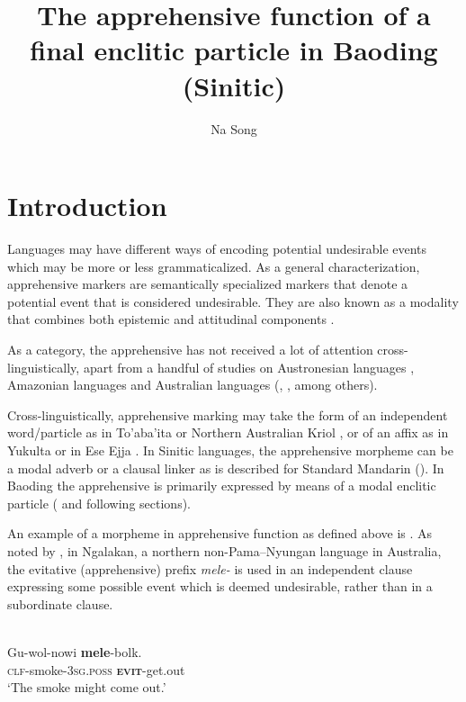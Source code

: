 \documentclass[output=paper,colorlinks,citecolor=brown, language=chinese]{langscibook}
\author{Na Song\orcid{}\affiliation{INALCO-CRLAO}}
\title{The apprehensive function of a final enclitic particle in Baoding (Sinitic)}
\begin{document}
\maketitle

\section{Introduction}

Languages may have different ways of encoding potential undesirable events which may be more or less grammaticalized. As a general characterization, apprehensive markers are semantically specialized markers that denote a potential event that is considered undesirable. They are also known as a modality that combines both epistemic and attitudinal components \citep[293]{lichtenberk1995}.

As a category, the apprehensive has not received a lot of attention cross-linguistically, apart from a handful of studies on Austronesian languages \citep{lichtenberk1995}, Amazonian languages \citep{vuillermet2018a} and Australian languages (\cite{Dixon2002}, \cite[255--296]{AngeloSchultze-Berndt2016}, \cite{Verstraete2005} among others).

Cross-linguistically, apprehensive marking may take the form of an independent word/particle as in To'aba'ita \citep{lichtenberk1995} or Northern Australian Kriol \citep{AngeloSchultze-Berndt2016}, or of an affix as in Yukulta \citep[247]{Keen1983} or in Ese Ejja \citep{vuillermet2018a}. In Sinitic languages, the apprehensive morpheme can be a modal adverb or a clausal linker as is described for Standard Mandarin (). In Baoding the apprehensive is primarily expressed by means of  a modal enclitic particle ( and following sections).

An example of a morpheme in apprehensive function as defined above is . As noted by \citet[102]{Merlan1983}, in Ngalakan, a northern non-Pama–Nyungan language in Australia, the evitative (apprehensive) prefix \textit{mele-} is used in an independent clause expressing some possible event which is deemed undesirable, rather than in a subordinate clause. 

\ea
\label{ex:Song1} 
 \\
\gll Gu-wol-nowi \textbf{mele}-bolk. \\
\textsc{clf}-smoke-\textsc{3sg.poss} \textbf{\textsc{evit}}-get.out \\
\glt `The smoke might come out.'
\z
\end{document}
